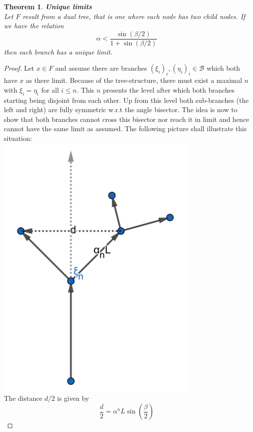 \documentclass[17pt]{extarticle}
\newtheorem*{theorem*}{Theorem}
\begin{document}
\begin{theorem*} 
	\textbf{Unique limits}\\
	Let $F$ result from a dual tree, that is one where each node has two child nodes.
	If we have the relation
	\begin{equation} \label{unique_branch_relation}
	\alpha<\frac{\sin(\beta/2)}{1+\sin(\beta/2)}
	\end{equation}
	then each branch has a unique limit.
\end{theorem*}
\begin{proof}
	Let $x\in F$ and assume there are branches $(\xi_i)_i, (\eta_i)_i\in\mathcal{B}$ which both have $x$ as there limit. Because of the tree-structure, there must exist a maximal $n$ with $\xi_i=\eta_i$ for all $i\leq n$. This $n$ presents the level after which both branches starting being disjoint from each other. Up from this level both sub-branches (the left and right) are fully symmetric w.r.t the angle bisector. The idea is now to show that both branches cannot cross this bisector nor reach it in limit and hence cannot have the same limit as assumed. The following picture shall illustrate this situation:\\
	\includegraphics[width=10cm]{unique_branch}
	\\
	The distance $d/2$ is given by 
	$$
	\frac{d}{2}=\alpha^{n}L\sin\left(\frac{\beta}{2}\right)
$$
\end{proof}
\end{document}
